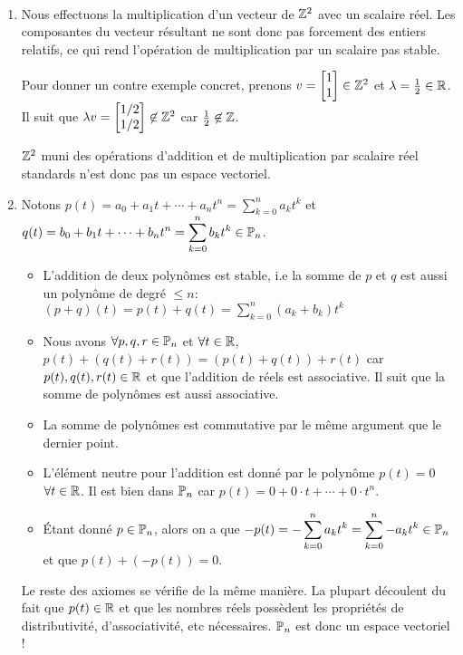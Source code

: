 \begin{exercice}
\,
\begin{enumerate}
    \item Nous effectuons la multiplication d'un vecteur de $\Z^2$ avec un scalaire réel. Les composantes du vecteur résultant ne sont donc pas forcement des entiers relatifs, ce qui rend l'opération de multiplication par un scalaire pas stable. 
    
    Pour donner un contre exemple concret, prenons $v = \begin{bmatrix} 1 \\ 1 \end{bmatrix} \in \Z^2$ et $\lambda = \frac{1}{2} \in \R$. Il suit que $\lambda v = \begin{bmatrix} 1/2 \\ 1/2 \end{bmatrix} \not\in \Z^2$ car $\frac{1}{2} \not\in \Z$.
    
    $\Z^2$ muni des opérations d'addition et de multiplication par scalaire réel standards n'est donc pas un espace vectoriel.
    
    \item Notons $\displaystyle p(t) = a_0 + a_1 t + \cdots + a_n t^n = \sum_{k=0}^{n} a_k t^k$ et $\displaystyle q(t) = b_0 + b_1 t + \cdots + b_n t^n = \sum_{k=0}^{n} b_k t^k \in \P_n$.
    \begin{itemize}
        \item L'addition de deux polynômes est stable, i.e la somme de $p$ et $q$ est aussi un polynôme de degré $\leq n$: $\displaystyle (p+q)(t) = p(t)+q(t) = \sum_{k=0}^{n} (a_k+b_k) t^k$
        \item Nous avons $\forall p,q,r \in \P_n$ et $\forall t \in \R$, $p(t) + (q(t) + r(t)) = (p(t) + q(t)) + r(t)$ car $p(t), q(t), r(t) \in \R$ et que l'addition de réels est associative. Il suit que la somme de polynômes est aussi associative.
        \item La somme de polynômes est commutative par le même argument que le dernier point.
        \item L'élément neutre pour l'addition est donné par le polynôme $p(t) = 0$ $\forall t \in \R$. Il est bien dans $\P_n$ car $p(t) = 0 + 0\cdot t + \cdots + 0 \cdot t^n$.
        \item Étant donné $p \in \P_n$, alors on a que $\displaystyle -p(t) = -\sum_{k=0}^{n} a_k t^k =  \sum_{k=0}^{n} -a_k t^k \in \P_n$ et que $p(t) + (-p(t)) = 0$.
    \end{itemize}
    Le reste des axiomes se vérifie de la même manière. La plupart découlent du fait que $p(t) \in \R$ et que les nombres réels possèdent les propriétés de distributivité, d'associativité, etc nécessaires. $\P_n$ est donc un espace vectoriel !
    

\end{enumerate}
\end{exercice}
